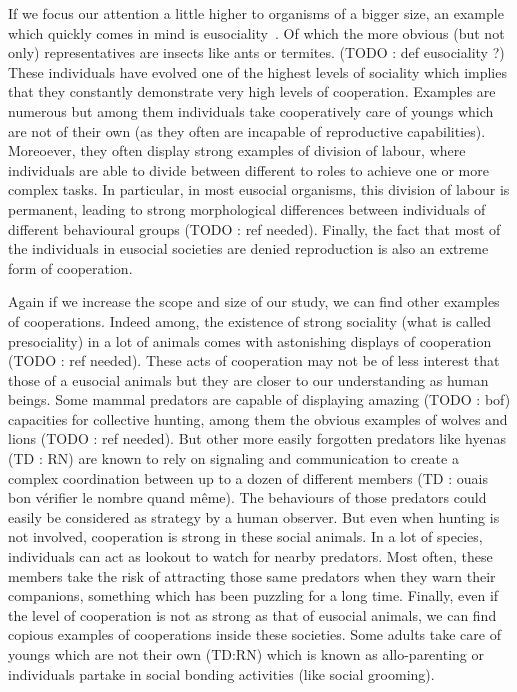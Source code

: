     If we focus our attention a little higher to organisms of a bigger size, an example which quickly comes in mind is eusociality~\cite{Wilson2005}. Of which the more obvious (but not only) representatives are insects like ants or termites. (TODO : def eusociality ?) These individuals have evolved one of the highest levels of sociality which implies that they constantly demonstrate very high levels of cooperation. Examples are numerous but among them individuals take cooperatively care of youngs which are not of their own (as they often are incapable of reproductive capabilities). Moreoever, they often display strong examples of division of labour, where individuals are able to divide between different to roles to achieve one or more complex tasks. In particular, in most eusocial organisms, this division of labour is permanent, leading to strong morphological differences between individuals of different behavioural groups (TODO : ref needed). Finally, the fact that most of the individuals in eusocial societies are denied reproduction is also an extreme form of cooperation.


    Again if we increase the scope and size of our study, we can find other examples of cooperations. Indeed among, the existence of strong sociality (what is called presociality) in a lot of animals comes with astonishing displays of cooperation (TODO : ref needed). These acts of cooperation may not be of less interest that those of a eusocial animals but they are closer to our understanding as human beings. Some mammal predators are capable of displaying amazing (TODO : bof) capacities for collective hunting, among them the obvious examples of wolves and lions (TODO : ref needed). But other more easily forgotten predators like hyenas (TD : RN) are known to rely on signaling and communication to create a complex coordination between up to a dozen of different members (TD : ouais bon vérifier le nombre quand même). The behaviours of those predators could easily be considered as strategy by a human observer. But even when hunting is not involved, cooperation is strong in these social animals. In a lot of species, individuals can act as lookout to watch for nearby predators. Most often, these members take the risk of attracting those same predators when they warn their companions, something which has been puzzling for a long time. Finally, even if the level of cooperation is not as strong as that of eusocial animals, we can find copious examples of cooperations inside these societies. Some adults take care of youngs which are not their own (TD:RN) which is known as allo-parenting or individuals partake in social bonding activities (like social grooming).

